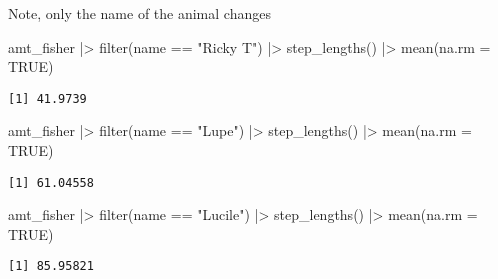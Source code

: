 \documentclass[ignorenonframetext,,t]{beamer}
\newenvironment{Shaded}{\begin{snugshade}}{\end{snugshade}}
\newcommand{\AttributeTok}[1]{\textcolor[rgb]{0.77,0.63,0.00}{#1}}
\newcommand{\ConstantTok}[1]{\textcolor[rgb]{0.00,0.00,0.00}{#1}}
\newcommand{\FunctionTok}[1]{\textcolor[rgb]{0.00,0.00,0.00}{#1}}
\newcommand{\NormalTok}[1]{#1}
\newcommand{\SpecialCharTok}[1]{\textcolor[rgb]{0.00,0.00,0.00}{#1}}
\newcommand{\StringTok}[1]{\textcolor[rgb]{0.31,0.60,0.02}{#1}}
\begin{document}
\begin{frame}[fragile]
Note, only the name of the animal changes

\begin{Shaded}
\begin{Highlighting}[]
\NormalTok{amt\_fisher }\SpecialCharTok{|\textgreater{}} \FunctionTok{filter}\NormalTok{(name }\SpecialCharTok{==} \StringTok{"Ricky T"}\NormalTok{) }\SpecialCharTok{|\textgreater{}} 
  \FunctionTok{step\_lengths}\NormalTok{() }\SpecialCharTok{|\textgreater{}} \FunctionTok{mean}\NormalTok{(}\AttributeTok{na.rm =} \ConstantTok{TRUE}\NormalTok{)}
\end{Highlighting}
\end{Shaded}

\begin{verbatim}
[1] 41.9739
\end{verbatim}

\begin{Shaded}
\begin{Highlighting}[]
\NormalTok{amt\_fisher }\SpecialCharTok{|\textgreater{}} \FunctionTok{filter}\NormalTok{(name }\SpecialCharTok{==} \StringTok{"Lupe"}\NormalTok{) }\SpecialCharTok{|\textgreater{}} 
  \FunctionTok{step\_lengths}\NormalTok{() }\SpecialCharTok{|\textgreater{}} \FunctionTok{mean}\NormalTok{(}\AttributeTok{na.rm =} \ConstantTok{TRUE}\NormalTok{)}
\end{Highlighting}
\end{Shaded}

\begin{verbatim}
[1] 61.04558
\end{verbatim}

\begin{Shaded}
\begin{Highlighting}[]
\NormalTok{amt\_fisher }\SpecialCharTok{|\textgreater{}} \FunctionTok{filter}\NormalTok{(name }\SpecialCharTok{==} \StringTok{"Lucile"}\NormalTok{) }\SpecialCharTok{|\textgreater{}} 
  \FunctionTok{step\_lengths}\NormalTok{() }\SpecialCharTok{|\textgreater{}} \FunctionTok{mean}\NormalTok{(}\AttributeTok{na.rm =} \ConstantTok{TRUE}\NormalTok{)}
\end{Highlighting}
\end{Shaded}

\begin{verbatim}
[1] 85.95821
\end{verbatim}
\end{frame}
\end{document}
